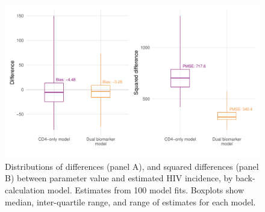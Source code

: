 \begin{figure}[htbp!]
  \centering
  \includegraphics[width=\textwidth]{incidence_mse_sim.pdf}
  \caption[Distributions of differences and squared differences between parameter value and estimated HIV incidence, by back-calculation model]{Distributions of differences (panel A), and squared differences (panel B) between parameter value and estimated HIV incidence, by back-calculation model. Estimates from 100 model fits. Boxplots show median, inter-quartile range, and range of estimates for each model.}\label{fig:mse_sim}
\end{figure}

